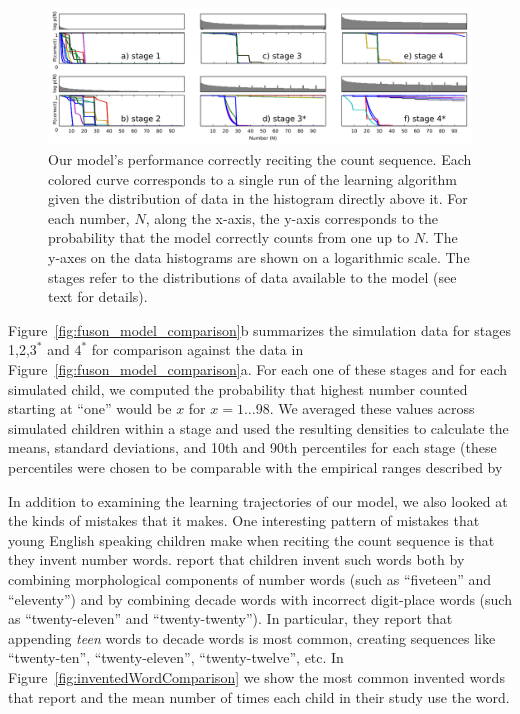 \documentclass[10pt,letterpaper]{article}
\begin{document}
\begin{figure}[t]
  \includegraphics[width=\linewidth]{figures/counting_grid2}
  \caption{Our model's performance correctly reciting the count
    sequence. Each colored curve corresponds to a single run of the learning
    algorithm given the distribution of data in the histogram directly
    above it. For each number, $N$, along the x-axis, the y-axis
    corresponds to the probability that the model correctly counts
    from one up to $N$. The y-axes on the data histograms are shown on
    a logarithmic scale. The stages refer to the distributions of data
    available to the model (see text for details).
  }\label{fig:counting_grid}
\end{figure}


Figure~\ref{fig:fuson_model_comparison}b summarizes the simulation
data for stages 1,2,$3^*$ and $4^*$ for comparison against the
\citeauthor{FusRicBriar1982} data in
Figure~\ref{fig:fuson_model_comparison}a. For each one of these stages
and for each simulated child, we computed the probability that highest
number counted starting at ``one'' would be $x$ for $x=1 \dots 98$. We
averaged these values across simulated children within a stage and
used the resulting densities to calculate the means, standard
deviations, and 10th and 90th percentiles for each stage (these
percentiles were chosen to be comparable with the empirical ranges described
by \citeauthor{FusRicBriar1982}

In addition to examining the learning trajectories of our model, we
also looked at the kinds of mistakes that it makes. One interesting
pattern of mistakes that young English speaking children make when
reciting the count sequence is that they invent number
words. \citeauthor{FusRicBriar1982} report that children invent such
words both by combining morphological components of number words (such
as ``fiveteen'' and ``eleventy'') and by combining decade words with
incorrect digit-place words (such as ``twenty-eleven'' and
``twenty-twenty''). In particular, they report that appending
\emph{teen} words to decade words is most common, creating sequences
like ``twenty-ten'', ``twenty-eleven'', ``twenty-twelve'', etc.
In Figure~\ref{fig:inventedWordComparison} we show the most common invented
words that \citeauthor{FusRicBriar1982} report and the mean number of
times each child in their study use the word. 
\end{document}
